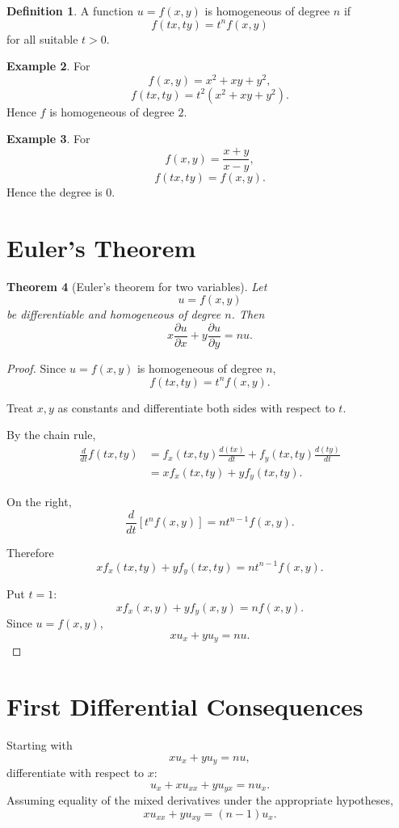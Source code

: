 \documentclass[11pt,oneside]{book}
\theoremstyle{studentthm}
\newtheorem{theorem}{Theorem}[chapter]
\theoremstyle{definition}
\newtheorem{definition}[theorem]{Definition}
\newtheorem{example}[theorem]{Example}
\newcommand{\pd}[2]{\frac{\partial #1}{\partial #2}}
\begin{document}
\begin{definition}
A function \(u=f(x,y)\) is homogeneous of degree \(n\) if
\[
f(tx,ty)=t^n f(x,y)
\]
for all suitable \(t>0\).
\end{definition}

\begin{example}
For
\[
f(x,y)=x^2+xy+y^2,
\]
\[
f(tx,ty)
=
t^2(x^2+xy+y^2).
\]
Hence \(f\) is homogeneous of degree \(2\).
\end{example}

\begin{example}
For
\[
f(x,y)=\frac{x+y}{x-y},
\]
\[
f(tx,ty)=f(x,y).
\]
Hence the degree is \(0\).
\end{example}

\section{Euler's Theorem}

\begin{theorem}[Euler's theorem for two variables]
Let
\[
u=f(x,y)
\]
be differentiable and homogeneous of degree \(n\). Then
\[
x\pd{u}{x}
+
y\pd{u}{y}
=
nu.
\]
\end{theorem}

\begin{proof}
Since \(u=f(x,y)\) is homogeneous of degree \(n\),
\[
f(tx,ty)=t^n f(x,y).
\]

Treat \(x,y\) as constants and differentiate both sides with respect
to \(t\).

By the chain rule,
\[
\begin{aligned}
\frac{d}{dt}f(tx,ty)
&=
f_x(tx,ty)\frac{d(tx)}{dt}
+
f_y(tx,ty)\frac{d(ty)}{dt}\\
&=
x f_x(tx,ty)
+
y f_y(tx,ty).
\end{aligned}
\]

On the right,
\[
\frac{d}{dt}
[t^n f(x,y)]
=
nt^{n-1}f(x,y).
\]

Therefore
\[
x f_x(tx,ty)
+
y f_y(tx,ty)
=
nt^{n-1}f(x,y).
\]

Put \(t=1\):
\[
x f_x(x,y)+y f_y(x,y)=nf(x,y).
\]
Since \(u=f(x,y)\),
\[
xu_x+yu_y=nu.
\]
\end{proof}

\section{First Differential Consequences}

Starting with
\[
xu_x+yu_y=nu,
\]
differentiate with respect to \(x\):
\[
u_x+xu_{xx}+yu_{yx}=nu_x.
\]
Assuming equality of the mixed derivatives under the appropriate
hypotheses,
\[
xu_{xx}+yu_{xy}=(n-1)u_x.
\]
\end{document}
